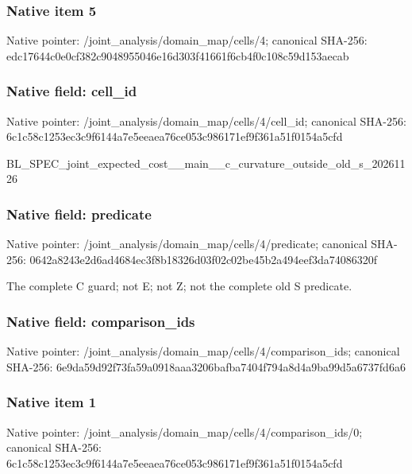 \documentclass[10pt,a4paper]{article}
\begin{document}
\subsubsection{Native item 5}


Native pointer: /joint\_analysis/domain\_map/cells/4; canonical SHA-256: edc17644c0e0cf382c904895\allowbreak{}5046e16d303f41661f6cb4f0\allowbreak{}c108c59d153aecab



\subsubsection{Native field: cell\_id}


Native pointer: /joint\_analysis/domain\_m\allowbreak{}ap/cells/4/cell\_id; canonical SHA-256: 6c1c58c1253ec3c9f6144a7e\allowbreak{}5eeaea76ce053c986171ef9f\allowbreak{}361a51f0154a5cfd


BL\_SPEC\_joint\_expected\_c\allowbreak{}ost\_\_main\_\_c\_curvature\_o\allowbreak{}utside\_old\_s\_20261126


\subsubsection{Native field: predicate}


Native pointer: /joint\_analysis/domain\_m\allowbreak{}ap/cells/4/predicate; canonical SHA-256: 0642a8243e2d6ad4684ec3f8\allowbreak{}b18326d03f02c02be45b2a49\allowbreak{}4eef3da74086320f


The complete C guard; not E; not Z; not the complete old S predicate.


\subsubsection{Native field: comparison\_ids}


Native pointer: /joint\_analysis/domain\_m\allowbreak{}ap/cells/4/comparison\_id\allowbreak{}s; canonical SHA-256: 6e9da59d92f73fa59a0918aa\allowbreak{}a3206bafba7404f794a8d4a9\allowbreak{}ba99d5a6737fd6a6



\subsubsection{Native item 1}


Native pointer: /joint\_analysis/domain\_m\allowbreak{}ap/cells/4/comparison\_id\allowbreak{}s/0; canonical SHA-256: 6c1c58c1253ec3c9f6144a7e\allowbreak{}5eeaea76ce053c986171ef9f\allowbreak{}361a51f0154a5cfd
\end{document}
